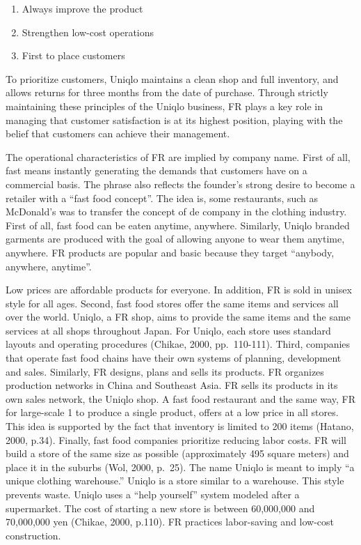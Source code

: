 \documentclass[12pt,a4paper]{article}
\providecommand{\tightlist}{%
  \setlength{\itemsep}{0pt}\setlength{\parskip}{0pt}}
\begin{document}
\begin{enumerate}
\def\labelenumi{(\arabic{enumi})}
\tightlist
\item
  Always improve the product
\item
  Strengthen low-cost operations
\item
  First to place customers
\end{enumerate}

To prioritize customers, Uniqlo maintains a clean shop and full
inventory, and allows returns for three months from the date of
purchase. Through strictly maintaining these principles of the Uniqlo
business, FR plays a key role in managing that customer satisfaction is
at its highest position, playing with the belief that customers can
achieve their management.

The operational characteristics of FR are implied by company name. First
of all, fast means instantly generating the demands that customers have
on a commercial basis. The phrase also reflects the founder's strong
desire to become a retailer with a ``fast food concept''. The idea is,
some restaurants, such as McDonald's was to transfer the concept of de
company in the clothing industry. First of all, fast food can be eaten
anytime, anywhere. Similarly, Uniqlo branded garments are produced with
the goal of allowing anyone to wear them anytime, anywhere. FR products
are popular and basic because they target ``anybody, anywhere,
anytime''.

Low prices are affordable products for everyone. In addition, FR is sold
in unisex style for all ages. Second, fast food stores offer the same
items and services all over the world. Uniqlo, a FR shop, aims to
provide the same items and the same services at all shops throughout
Japan. For Uniqlo, each store uses standard layouts and operating
procedures (Chikae, 2000, pp.~110-111). Third, companies that operate
fast food chains have their own systems of planning, development and
sales. Similarly, FR designs, plans and sells its products. FR organizes
production networks in China and Southeast Asia. FR sells its products
in its own sales network, the Uniqlo shop. A fast food restaurant and
the same way, FR for large-scale 1 to produce a single product, offers
at a low price in all stores. This idea is supported by the fact that
inventory is limited to 200 items (Hatano, 2000, p.34). Finally, fast
food companies prioritize reducing labor costs. FR will build a store of
the same size as possible (approximately 495 square meters) and place it
in the suburbs (Wol, 2000, p.~25). The name Uniqlo is meant to imply ``a
unique clothing warehouse.'' Uniqlo is a store similar to a warehouse.
This style prevents waste. Uniqlo uses a ``help yourself'' system
modeled after a supermarket. The cost of starting a new store is between
60,000,000 and 70,000,000 yen (Chikae, 2000, p.110). FR practices
labor-saving and low-cost construction.
\end{document}
